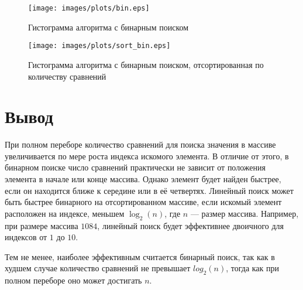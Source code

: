 \begin{figure}[h]
    \centering
    \texttt{[image: images/plots/bin.eps]}
    \caption{Гистограмма алгоритма с бинарным поиском}
    \label{fig:plt_2}
\end{figure}

\begin{figure}[h]
    \centering
    \texttt{[image: images/plots/sort\_bin.eps]}
    \caption{Гистограмма алгоритма с бинарным поиском, отсортированная по количеству сравнений}
    \label{fig:plt_3}
\end{figure}

\clearpage

\section{Вывод}

При полном переборе количество сравнений для поиска значения в массиве увеличивается по мере роста индекса искомого элемента. В отличие от этого, в бинарном поиске число сравнений практически не зависит от положения элемента в начале или конце массива. Однако элемент будет найден быстрее, если он находится ближе к середине или в её четвертях. Линейный поиск может быть быстрее бинарного на отсортированном массиве, если искомый элемент расположен на индексе, меньшем $\log_2(n)$, где $n$ — размер массива. Например, при размере массива $1084$, линейный поиск будет эффективнее двоичного для индексов от $1$ до $10$.

Тем не менее, наиболее эффективным считается бинарный поиск, так как в худшем случае количество сравнений не превышает $log_2(n)$, тогда как при полном переборе оно может достигать $n$.